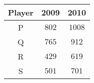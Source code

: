 \begin{center}
    \begin{tabular}{|c|c|c|}
        \hline
        Player & 2009 & 2010 \\
        \hline
        P & $802$ & $1008$ \\
        Q & $765$ & $912$ \\
        R & $429$ & $619$ \\
        S & $501$ & $701$ \\
        \hline
    \end{tabular}
    \end{center}
